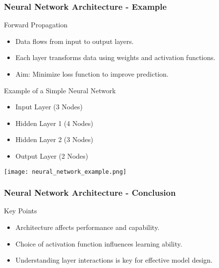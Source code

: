 \documentclass[aspectratio=169]{beamer}
\begin{document}
\begin{frame}[fragile]
    \frametitle{Neural Network Architecture - Example}
    \begin{block}{Forward Propagation}
        \begin{itemize}
            \item Data flows from input to output layers.
            \item Each layer transforms data using weights and activation functions.
            \item Aim: Minimize loss function to improve prediction.
        \end{itemize}
    \end{block}
    
    \begin{block}{Example of a Simple Neural Network}
        \begin{itemize}
            \item Input Layer (3 Nodes) 
            \item Hidden Layer 1 (4 Nodes)
            \item Hidden Layer 2 (3 Nodes)
            \item Output Layer (2 Nodes)
        \end{itemize}
        \begin{center}
            \texttt{[image: neural\_network\_example.png]}
        \end{center}
    \end{block}
\end{frame}

\begin{frame}[fragile]
    \frametitle{Neural Network Architecture - Conclusion}
    \begin{block}{Key Points}
        \begin{itemize}
            \item Architecture affects performance and capability.
            \item Choice of activation function influences learning ability.
            \item Understanding layer interactions is key for effective model design.
        \end{itemize}
    \end{block}
\end{frame}
\end{document}
